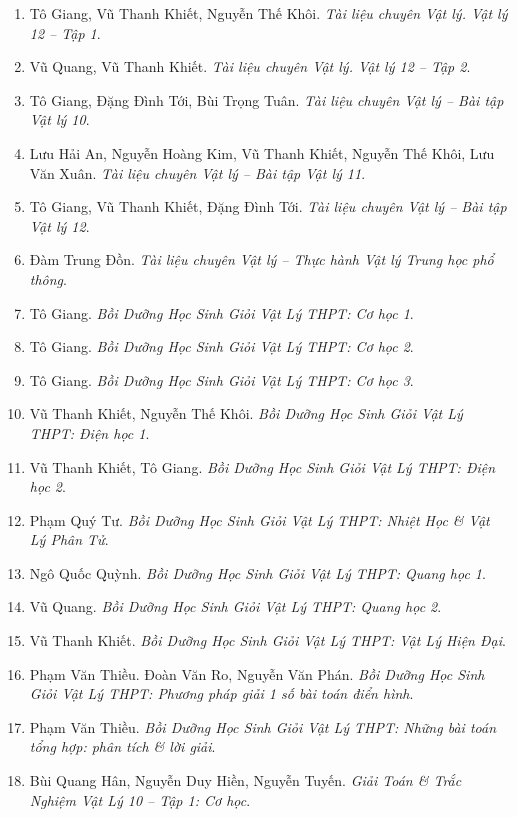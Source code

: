\documentclass{article}
\begin{document}
\begin{enumerate}	
	\item Tô Giang, Vũ Thanh Khiết, Nguyễn Thế Khôi. \textit{Tài liệu chuyên Vật lý. Vật lý 12 -- Tập 1}.
	\item Vũ Quang, Vũ Thanh Khiết. \textit{Tài liệu chuyên Vật lý. Vật lý 12 -- Tập 2}.
	\item Tô Giang, Đặng Đình Tới, Bùi Trọng Tuân. \textit{Tài liệu chuyên Vật lý -- Bài tập Vật lý 10}.
	\item Lưu Hải An, Nguyễn Hoàng Kim, Vũ Thanh Khiết, Nguyễn Thế Khôi, Lưu Văn Xuân. \textit{Tài liệu chuyên Vật lý -- Bài tập Vật lý 11}.
	\item Tô Giang, Vũ Thanh Khiết, Đặng Đình Tới. \textit{Tài liệu chuyên Vật lý -- Bài tập Vật lý 12}.
	\item Đàm Trung Đồn. \textit{Tài liệu chuyên Vật lý -- Thực hành Vật lý Trung học phổ thông}.
	\item Tô Giang. \textit{Bồi Dưỡng Học Sinh Giỏi Vật Lý THPT: Cơ học 1}.\hfill{\sf[bought]}
	\item Tô Giang. \textit{Bồi Dưỡng Học Sinh Giỏi Vật Lý THPT: Cơ học 2}.\hfill{\sf[bought]}
	\item Tô Giang. \textit{Bồi Dưỡng Học Sinh Giỏi Vật Lý THPT: Cơ học 3}.\hfill{\sf[bought]}
	\item Vũ Thanh Khiết, Nguyễn Thế Khôi. \textit{Bồi Dưỡng Học Sinh Giỏi Vật Lý THPT: Điện học 1}.\hfill{\sf[bought]}
	\item Vũ Thanh Khiết, Tô Giang. \textit{Bồi Dưỡng Học Sinh Giỏi Vật Lý THPT: Điện học 2}.\hfill{\sf[bought]}
	\item Phạm Quý Tư. \textit{Bồi Dưỡng Học Sinh Giỏi Vật Lý THPT: Nhiệt Học \& Vật Lý Phân Tử}.
	\item Ngô Quốc Quỳnh. \textit{Bồi Dưỡng Học Sinh Giỏi Vật Lý THPT: Quang học 1}.\hfill{\sf[bought]}
	\item Vũ Quang. \textit{Bồi Dưỡng Học Sinh Giỏi Vật Lý THPT: Quang học 2}.
	\item Vũ Thanh Khiết. \textit{Bồi Dưỡng Học Sinh Giỏi Vật Lý THPT: Vật Lý Hiện Đại}.
	\item Phạm Văn Thiều. Đoàn Văn Ro, Nguyễn Văn Phán. \textit{Bồi Dưỡng Học Sinh Giỏi Vật Lý THPT: Phương pháp giải 1 số bài toán điển hình}.
	\item Phạm Văn Thiều. \textit{Bồi Dưỡng Học Sinh Giỏi Vật Lý THPT: Những bài toán tổng hợp: phân tích \& lời giải}.
	\item Bùi Quang Hân, Nguyễn Duy Hiền, Nguyễn Tuyến. \textit{Giải Toán \& Trắc Nghiệm Vật Lý 10 -- Tập 1: Cơ học}.

\end{enumerate}
\end{document}
